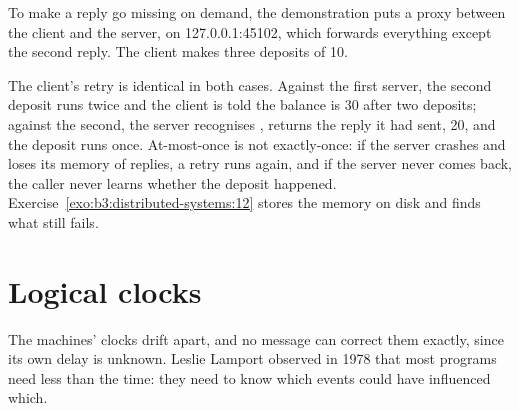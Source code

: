 \label{lst:b3:distributed-systems:stub}

To make a reply go missing on demand, the demonstration puts a proxy between the client and the server, on 127.0.0.1:45102, which forwards everything except the second reply. The client makes three deposits of 10.

\label{out:b3:distributed-systems:rpc}

The client's retry is identical in both cases. Against the first server, the second deposit runs twice and the client is told the balance is 30 after two deposits; against the second, the server recognises , returns the reply it had sent, 20, and the deposit runs once. At-most-once is not exactly-once: if the server crashes and loses its memory of replies, a retry runs again, and if the server never comes back, the caller never learns whether the deposit happened. Exercise~\ref{exo:b3:distributed-systems:12} stores the memory on disk and finds what still fails.

\section{Logical clocks}\label{sec:b3:distributed-systems:clocks}

The machines' clocks drift apart, and no message can correct them exactly, since its own delay is unknown. Leslie Lamport observed in 1978 that most programs need less than the time: they need to know which events could have influenced which. %

